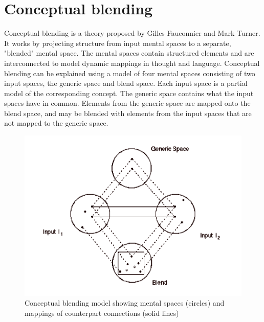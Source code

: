 



\section{Conceptual blending}
Conceptual blending is a theory proposed by Gilles Fauconnier and Mark Turner. It works by projecting structure from input mental spaces to a separate, "blended" mental space. \parencite{fauconnier1998conceptual}
The mental spaces contain structured elements and are interconnected to model dynamic mappings in thought and language.
Conceptual blending can be explained using a model of four mental spaces consisting of two input spaces, the generic space and blend space. Each input space is a partial model of the corresponding concept. The generic space contains what the input spaces have in common. Elements from the generic space are mapped onto the blend space, and may be blended with elements from the input spaces that are not mapped to the generic space.
\begin{figure}
\centering
\includegraphics[width=0.7\linewidth]{"Figures/concept blending firkant"}
\caption{Conceptual blending model showing mental spaces (circles) and mappings of counterpart connections (solid lines) \parencite{fauconnier1998conceptualfigure}}
\label{fig:concept-blending-firkant}
\end{figure}

